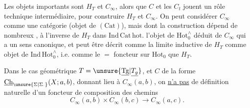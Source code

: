 Les objets importants sont $H_T$ et $C_\infty$, alors que $C$  et les $C_t$ jouent un rôle technique intermédiaire, pour construire $H_T$ et $C_\infty$. On peut considérer $C_\infty$ comme une catégorie (objet de $(\mathrm{Cat})$), mais dont la construction dépend de nombreux , à l'inverse de $H_T$ dans $\mathrm{Ind\,Cat\,hot}$.  l'objet de $\mathrm{Hot}_0^\wedge$ déduit de $C_\infty$ qui a un sens canonique, et peut être décrit comme la limite inductive de $H_T$ comme objet de $\mathrm{Ind\,Hot}_0^\wedge$, i.e. comme  le $=$ foncteur sur $\mathrm{Hot}_0$ que $H_T$.

Dans le cas géométrique $T=\unsure{\underline{\mathrm{Tg}}|\underline{T_g}}$, et  $C$ de la forme $\underline{\mathrm{Ch}}_{\unsure{\Sigma|\Sigma_{\cdot}}}(X;a,b)$, donnant lieu à $C_\infty(a,b)$, on \uline{n'a pas} de définition naturelle d'un foncteur de composition des chemins
\[
C_\infty(a,b)\times C_\infty(b,c)\longrightarrow C_\infty(a,c).
\]

